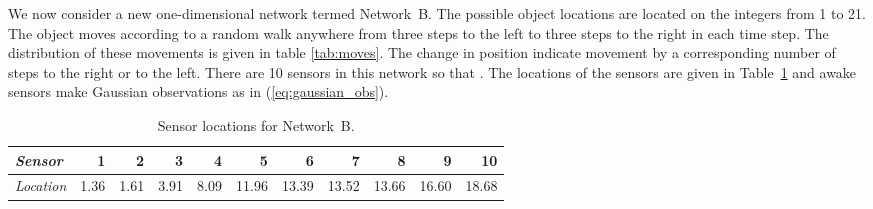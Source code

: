 \documentclass[journal,draftcls,onecolumn,11pt]{IEEEtran}
\begin{document}
We now consider a new one-dimensional network termed Network~B.  The possible object locations are located on the integers from 1 to 21.  The object moves according to a random walk anywhere from three steps to the left to three steps to the right in each time step. The distribution of these movements is given in table \ref{tab:moves}. The change in position indicate movement by a corresponding number of steps to the right or to the left. There are 10 sensors in this network so that . The locations of the sensors are given in Table~\ref{tab:sensloc} and awake sensors make Gaussian observations as in (\ref{eq:gaussian_obs}).
\begin{table}
   \begin{center}
      \caption{Sensor locations for Network~B. \label{tab:sensloc}}
      \begin{tabular}{|l|r|r|r|r|r|r|r|r|r|r|}
         \hline
         {\em Sensor} & 1 & 2 & 3 & 4 & 5 & 6 & 7 & 8 & 9 & 10 \\ \hline
         {\em Location} & 1.36 & 1.61 & 3.91 & 8.09 & 11.96 & 13.39 & 13.52 & 13.66 & 16.60 & 18.68 \\ \hline
      \end{tabular}
   \end{center}
\end{table}
\end{document}
